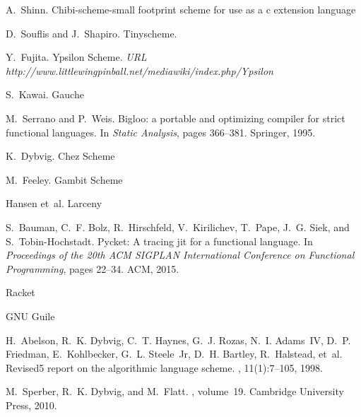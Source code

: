 \documentclass[preprint, numbers]{sigplanconf}
\begin{document}
\begin{thebibliography}{}
  \softraggedright

 A.~Shinn.  \newblock Chibi-scheme-small footprint
  scheme for use as a c extension language 

 D.~Souflis and J.~Shapiro.  \newblock
  Tinyscheme.  

 Y.~Fujita.  \newblock Ypsilon Scheme. \newblock
  {\em URL http://www.littlewingpinball.net/mediawiki/index.php/Ypsilon}

 S.~Kawai. \newblock Gauche 

M.~Serrano and P.~Weis.
\newblock Bigloo: a portable and optimizing compiler for strict functional
  languages.
\newblock In {\em Static Analysis}, pages 366--381. Springer, 1995.

 K.~Dybvig. \newblock Chez Scheme

 M.~Feeley. \newblock Gambit Scheme

 Hansen et~al. \newblock Larceny

 S.~Bauman,
  C.~F. Bolz, R.~Hirschfeld, V.~Kirilichev, T.~Pape, J.~G. Siek, and
  S.~Tobin-Hochstadt.  \newblock Pycket: A tracing jit for a functional
  language.  \newblock In {\em Proceedings of the 20th ACM SIGPLAN
    International Conference on Functional Programming}, pages 22--34. ACM,
  2015.

 \newblock Racket 

 \newblock GNU Guile

H.~Abelson, R.~K. Dybvig, C.~T. Haynes, G.~J. Rozas, N.~I. Adams~IV, D.~P.
  Friedman, E.~Kohlbecker, G.~L. Steele~Jr, D.~H. Bartley, R.~Halstead, et~al.
\newblock Revised5 report on the algorithmic language scheme.
, 11(1):7--105, 1998.

 M.~Sperber, R.~K. Dybvig, and M.~Flatt.
  ,
  volume~19.  \newblock Cambridge University Press, 2010.


\end{thebibliography}
\end{document}
